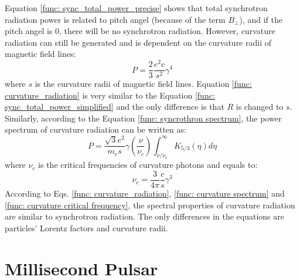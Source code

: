 \documentclass[12pt]{report}
\begin{document}
          Equation \ref{func: sync_total_power_precise} shows that total synchrotron radiation 
          power is related to pitch angel (because of the term $B_\perp$), and if the 
          pitch angel is $0$, there will be no synchrotron radiation. However, curvature 
          radiation can still be generated and is dependent on the curvature radii of 
          magnetic field lines:
          \begin{equation}
            \label{func: curvature_radiation}
            P = \frac{2}{3}\frac{e^2c}{s^2}\gamma^4
          \end{equation}
          where $s$ is the curvature radii of magnetic field lines. 
          Equation \ref{func: curvature_radiation} is very similar to the Equation 
          \ref{func: sync_total_power_simplified} and the only difference is that 
          $R$ is changed to $s$. Similarly, according to the Equation 
          \ref{func: syncrothron spectrum}, the power spectrum of curvature radiation can 
          be written as:
          \begin{equation}
            \label{func: curvature spectrum}
            P = \frac{\sqrt{3}e^2}{m_es}\gamma \left(\frac{\nu}{\nu_c}\right) \int_{\nu / \nu_c}^{\infty} K_{5/3}\left(\eta \right)d\eta
          \end{equation}
          where $\nu_c$ is the critical frequencies of curvature photons and equals to:
          \begin{equation}
            \label{func: curvature critical frequency}
            \nu_c = \frac{3}{4\pi}\frac{c}{s}\gamma^3
          \end{equation}
          According to Eqs. \ref{func: curvature_radiation}, \ref{func: curvature spectrum} 
          and \ref{func: curvature critical frequency}, the spectral properties of curvature 
          radiation are similar to synchrotron radiation. The only differences in the 
          equations are particles' Lorentz factors and curvature radii. 

        

      \section{Millisecond Pulsar} 
\end{document}

